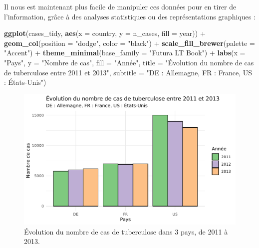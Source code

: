 \documentclass[a4paperpaper,]{article}
\newenvironment{Shaded}{\begin{snugshade}}{\end{snugshade}}
\newcommand{\DataTypeTok}[1]{\textcolor[rgb]{0.00,0.34,0.68}{#1}}
\newcommand{\KeywordTok}[1]{\textcolor[rgb]{0.12,0.11,0.11}{\textbf{#1}}}
\newcommand{\NormalTok}[1]{\textcolor[rgb]{0.12,0.11,0.11}{#1}}
\newcommand{\OperatorTok}[1]{\textcolor[rgb]{0.12,0.11,0.11}{#1}}
\newcommand{\StringTok}[1]{\textcolor[rgb]{0.75,0.01,0.01}{#1}}
\begin{document}
Il nous est maintenant plus facile de manipuler ces données pour en tirer de l'information, grâce à des analyses statistiques ou des représentations graphiques :

\begin{Shaded}
\begin{Highlighting}[]
\KeywordTok{ggplot}\NormalTok{(cases_tidy, }\KeywordTok{aes}\NormalTok{(}\DataTypeTok{x =}\NormalTok{ country, }\DataTypeTok{y =}\NormalTok{ n_cases, }\DataTypeTok{fill =}\NormalTok{ year)) }\OperatorTok{+}
\StringTok{  }\KeywordTok{geom_col}\NormalTok{(}\DataTypeTok{position =} \StringTok{"dodge"}\NormalTok{, }\DataTypeTok{color =} \StringTok{"black"}\NormalTok{) }\OperatorTok{+}
\StringTok{  }\KeywordTok{scale_fill_brewer}\NormalTok{(}\DataTypeTok{palette =} \StringTok{"Accent"}\NormalTok{) }\OperatorTok{+}
\StringTok{  }\KeywordTok{theme_minimal}\NormalTok{(}\DataTypeTok{base_family =} \StringTok{"Futura LT Book"}\NormalTok{) }\OperatorTok{+}
\StringTok{  }\KeywordTok{labs}\NormalTok{(}\DataTypeTok{x =} \StringTok{"Pays"}\NormalTok{,}
       \DataTypeTok{y =} \StringTok{"Nombre de cas"}\NormalTok{,}
       \DataTypeTok{fill =} \StringTok{"Année"}\NormalTok{,}
       \DataTypeTok{title =} \StringTok{"Évolution du nombre de cas de tuberculose entre 2011 et 2013"}\NormalTok{,}
       \DataTypeTok{subtitle =} \StringTok{"DE : Allemagne, FR : France, US : États-Unis"}\NormalTok{)}
\end{Highlighting}
\end{Shaded}

\begin{figure}[htpb]

{\centering \includegraphics[width=0.9\linewidth]{figure/casesbarplot-1} 

}

\caption{Évolution du nombre de cas de tuberculose dans 3 pays, de 2011 à 2013.}\label{fig:casesbarplot}
\end{figure}
\end{document}
